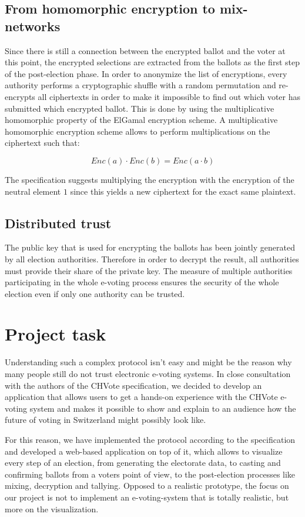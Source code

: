 \subsection{From homomorphic encryption to mix-networks}

Since there is still a connection between the encrypted ballot and the voter at this point, the encrypted selections are extracted from the ballots as the first step of the post-election phase. In order to anonymize the list of encryptions, every authority performs a cryptographic shuffle with a random permutation and re-encrypts all ciphertexts in order to make it impossible to find out which voter has submitted which encrypted ballot. This is done by using the multiplicative homomorphic property of the ElGamal encryption scheme. A multiplicative homomorphic encryption scheme allows to perform multiplications on the ciphertext such that:

\begin{equation*}Enc(a) \cdot Enc(b) = Enc(a \cdot b)\end{equation*}

The specification suggests multiplying the encryption with the encryption of the neutral element $1$ since this yields a new ciphertext for the exact same plaintext.

\subsection{Distributed trust}
The public key that is used for encrypting the ballots has been jointly generated by all election authorities. Therefore in order to decrypt the result, all authorities must provide their share of the private key. The measure of multiple authorities participating in the whole e-voting process ensures the security of the whole election even if only one authority can be trusted.

\section{Project task}

Understanding such a complex protocol isn't easy and might be the reason why many people still do not trust electronic e-voting systems. In close consultation with the authors of the CHVote specification, we decided to develop an application that allows users to get a hands-on experience with the CHVote e-voting system and makes it possible to show and explain to an audience how the future of voting in Switzerland might possibly look like.

For this reason, we have implemented the protocol according to the specification and developed a web-based application on top of it, which allows to visualize every step of an election, from generating the electorate data, to casting and confirming ballots from a voters point of view, to the post-election processes like mixing, decryption and tallying. Opposed to a realistic prototype, the focus on our project is not to implement an e-voting-system that is totally realistic, but more on the visualization. 